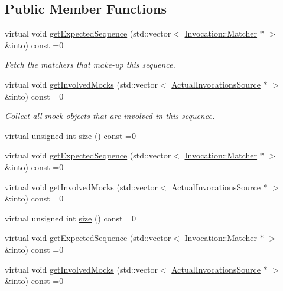 \subsection*{Public Member Functions}
\begin{DoxyCompactItemize}
\item 
virtual void \mbox{\hyperlink{classfakeit_1_1Sequence_aa1a1e4ad2fcac3379ba38f250bf06884}{get\+Expected\+Sequence}} (std\+::vector$<$ \mbox{\hyperlink{structfakeit_1_1Invocation_1_1Matcher}{Invocation\+::\+Matcher}} $\ast$ $>$ \&into) const =0
\begin{DoxyCompactList}\small\item\em Fetch the matchers that make-\/up this sequence. \end{DoxyCompactList}\item 
virtual void \mbox{\hyperlink{classfakeit_1_1Sequence_a4af96a0de0fa659fe826431e4d61757a}{get\+Involved\+Mocks}} (std\+::vector$<$ \mbox{\hyperlink{structfakeit_1_1ActualInvocationsSource}{Actual\+Invocations\+Source}} $\ast$ $>$ \&into) const =0
\begin{DoxyCompactList}\small\item\em Collect all mock objects that are involved in this sequence. \end{DoxyCompactList}\item 
virtual unsigned int \mbox{\hyperlink{classfakeit_1_1Sequence_aa9a45b45fc715148832a9dfb7b555556}{size}} () const =0
\item 
virtual void \mbox{\hyperlink{classfakeit_1_1Sequence_aa1a1e4ad2fcac3379ba38f250bf06884}{get\+Expected\+Sequence}} (std\+::vector$<$ \mbox{\hyperlink{structfakeit_1_1Invocation_1_1Matcher}{Invocation\+::\+Matcher}} $\ast$ $>$ \&into) const =0
\item 
virtual void \mbox{\hyperlink{classfakeit_1_1Sequence_a4af96a0de0fa659fe826431e4d61757a}{get\+Involved\+Mocks}} (std\+::vector$<$ \mbox{\hyperlink{structfakeit_1_1ActualInvocationsSource}{Actual\+Invocations\+Source}} $\ast$ $>$ \&into) const =0
\item 
virtual unsigned int \mbox{\hyperlink{classfakeit_1_1Sequence_aa9a45b45fc715148832a9dfb7b555556}{size}} () const =0
\item 
virtual void \mbox{\hyperlink{classfakeit_1_1Sequence_aa1a1e4ad2fcac3379ba38f250bf06884}{get\+Expected\+Sequence}} (std\+::vector$<$ \mbox{\hyperlink{structfakeit_1_1Invocation_1_1Matcher}{Invocation\+::\+Matcher}} $\ast$ $>$ \&into) const =0
\item 
virtual void \mbox{\hyperlink{classfakeit_1_1Sequence_a4af96a0de0fa659fe826431e4d61757a}{get\+Involved\+Mocks}} (std\+::vector$<$ \mbox{\hyperlink{structfakeit_1_1ActualInvocationsSource}{Actual\+Invocations\+Source}} $\ast$ $>$ \&into) const =0

\end{DoxyCompactItemize}
